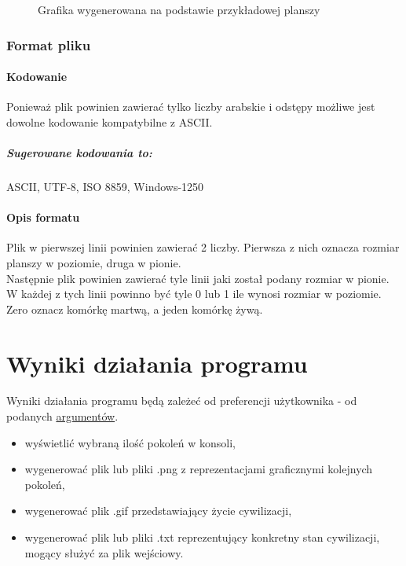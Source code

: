 \documentclass{report}
\begin{document}
\begin{figure}[h]
\centering
\setlength{\fboxsep}{0pt} %
\setlength{\fboxrule}{1pt} %
\caption{Grafika wygenerowana na podstawie przykładowej planszy}
\end{figure}

\subsection{Format pliku}
\subsubsection*{Kodowanie}
Ponieważ plik powinien zawierać tylko liczby arabskie i odstępy możliwe jest dowolne kodowanie kompatybilne z ASCII. \\
\paragraph{Sugerowane kodowania to:}
ASCII, UTF-8, ISO 8859, Windows-1250

\subsubsection*{Opis formatu}
Plik w pierwszej linii powinien zawierać 2 liczby. Pierwsza z nich oznacza rozmiar planszy w poziomie, druga w pionie. \\
Następnie plik powinien zawierać tyle linii jaki został podany rozmiar w pionie. W każdej z tych linii powinno być tyle 0 lub 1 ile wynosi rozmiar w poziomie. \\
Zero oznacz komórkę martwą, a jeden komórkę żywą.

\chapter{Wyniki działania programu}
Wyniki działania programu będą zależeć od preferencji użytkownika -  od podanych \hyperref[argumenty]{\textcolor{LinkColor}{argumentów}}. 
\begin{itemize}
\item wyświetlić wybraną ilość pokoleń w konsoli,
\item wygenerować plik lub pliki .png z reprezentacjami graficznymi kolejnych pokoleń,
\item wygenerować plik .gif przedstawiający życie cywilizacji,
\item wygenerować plik lub pliki .txt reprezentujący konkretny stan cywilizacji, mogący służyć za plik wejściowy.
\end{itemize}
\end{document}
